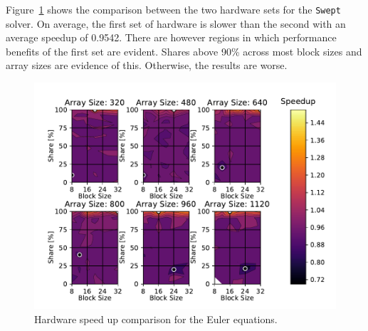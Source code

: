 \documentclass[review]{elsarticle}
\def\Swept{\texttt{Swept}}
\begin{document}
Figure~\ref{fig:eulerHardwareComp} shows the comparison between the two hardware sets for the \Swept{} solver. On average, the first set of hardware is slower than the second with an average speedup of 0.9542. There are however regions in which performance benefits of the first set are evident. Shares above 90\% across most block sizes and array sizes are evidence of this. Otherwise, the results are worse. 

\begin{figure}[htb!]
    \centering
    \includegraphics[scale=0.7]{figs/hardwareSpeedUpeuler.pdf}
    \caption{Hardware speed up comparison for the Euler equations.}
    \label{fig:eulerHardwareComp}
\end{figure}
\end{document}
